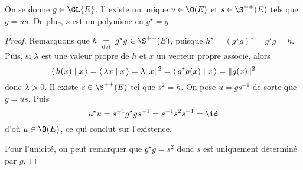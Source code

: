 \begin{thm}
    On se donne $g \in  \GL{E}$. Il existe un unique $u \in  \O(E)$ et $s \in  \S ^{++}(E)$ tels que $g=us$. De plus,  $s$ est un polynôme en  $g^\star=g$
\end{thm}

\begin{proof}
    Remarquons que $h\defeq g^\star g \in  \S ^{++}(E)$, puisque $h^\star=(g^\star g)^\star=g^\star g=h$. Puis, si  $\lambda$ est une valeur propre de  $h$ et  $x$ un vecteur propre associé, alors  \[
        \scalar{h(x)}{x} = \scalar{\lambda x}{x} = \lambda \|x\|^2 = \scalar{g^\star g (x)}{x} = \|g(x)\|^2 
    \] 
    donc $ \lambda >0$. Il existe $s \in \S^{ ++ }(E)$ tel que $s^2 =h$. On pose $u=gs^{-1}$ de sorte que $g=us$. Puis  \[
    u^\star u=s^{-1}g^\star g s^{-1}=s ^{-1} s^2 s ^{-1}=\id
    \] 
    d'où $u \in  \O(E)$, ce qui conclut sur l'existence.

    Pour l'unicité, on peut remarquer que $g^\star g=s^2$ donc  $s$ est uniquement déterminé par  $g$.
\end{proof}
